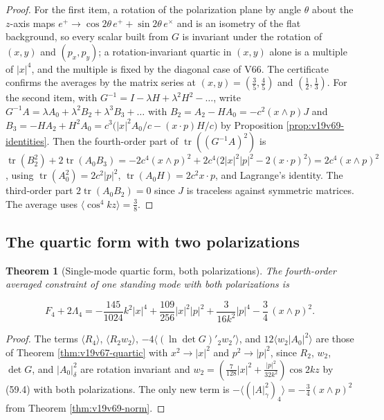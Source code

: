 \documentclass[11pt]{article}
\newtheorem{theorem}{Theorem}[section]
\theoremstyle{remark}
\begin{document}
\begin{proof}
For the first item, a rotation of the polarization plane by angle
\(\theta\) about the \(z\)-axis maps \(e^+\to\cos2\theta\,e^++\sin2\theta\,e^\times\)
and is an isometry of the flat background, so every scalar built from
\(G\) is invariant under the rotation of \((x,y)\) and \((p_x,p_y)\);
a rotation-invariant quartic in \((x,y)\) alone is a multiple of
\(|x|^4\), and the multiple is fixed by the diagonal case of V66.  The
certificate confirms the averages by the matrix series at
\((x,y)=(\tfrac35,\tfrac45)\) and \((\tfrac12,\tfrac13)\).  For the second
item, with \(G^{-1}=I-\lambda H+\lambda^2H^2-\dots\), write
\(G^{-1}A=\lambda A_0+\lambda^2B_2+\lambda^3B_3+\dots\) with
\(B_2=A_2-HA_0=-c^2(x\wedge p)J\) and
\(B_3=-HA_2+H^2A_0=c^3\bigl(|x|^2A_0/c-(x\cdot p)H/c\bigr)\) by
Proposition \ref{prop:v19v69-identities}.  Then the fourth-order part of
\(\operatorname{tr}((G^{-1}A)^2)\) is
\(\operatorname{tr}(B_2^2)+2\operatorname{tr}(A_0B_3)
=-2c^4(x\wedge p)^2+2c^4\bigl(2|x|^2|p|^2-2(x\cdot p)^2\bigr)=2c^4(x\wedge p)^2\),
using \(\operatorname{tr}(A_0^2)=2c^2|p|^2\),
\(\operatorname{tr}(A_0H)=2c^2x\cdot p\), and Lagrange's identity.  The
third-order part \(2\operatorname{tr}(A_0B_2)=0\) since \(J\) is
traceless against symmetric matrices.  The average uses
\(\langle\cos^4kz\rangle=\tfrac38\).
\end{proof}

\subsection{The quartic form with two polarizations}

\begin{theorem}[Single-mode quartic form, both polarizations]
\label{thm:v19v69-form}
The fourth-order averaged constraint of one standing mode with both
polarizations is

\[
 F_4+2\Lambda_4=-\frac{145}{1024}k^2|x|^4+\frac{109}{256}|x|^2|p|^2
 +\frac{3}{16k^2}|p|^4-\frac34\,(x\wedge p)^2.                          \tag{72.1}
\]
\end{theorem}

\begin{proof}
The terms \(\langle R_4\rangle\), \(\langle R_2w_2\rangle\),
\(-4\langle(\ln\det G)'_2w_2'\rangle\), and \(12\langle w_2|A_0|^2\rangle\)
are those of Theorem \ref{thm:v19v67-quartic} with \(x^2\to|x|^2\) and
\(p^2\to|p|^2\), since \(R_2\), \(w_2\), \(\det G\), and \(|A_0|^2_\delta\)
are rotation invariant and \(w_2=(\tfrac7{128}|x|^2+\tfrac{|p|^2}{32k^2})\cos2kz\)
by (59.4) with both polarizations.  The only new term is
\(-\langle(|A|_\gamma^2)_4\rangle=-\tfrac34(x\wedge p)^2\) from Theorem
\ref{thm:v19v69-norm}.
\end{proof}
\end{document}
